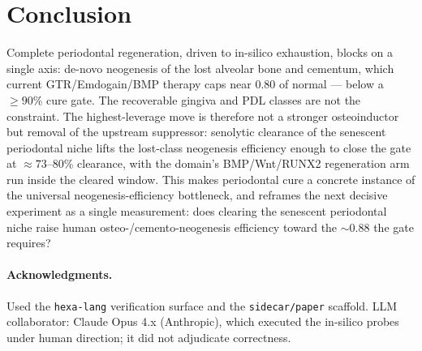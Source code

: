 \documentclass[11pt,a4paper]{article}
\begin{document}
\section{Conclusion}
\label{sec:conclusion}
Complete periodontal regeneration, driven to in-silico exhaustion, blocks on a single
axis: de-novo neogenesis of the lost alveolar bone and cementum, which current
GTR/Emdogain/BMP therapy caps near $0.80$ of normal --- below a $\geq 90\%$ cure gate.
The recoverable gingiva and PDL classes are not the constraint. The highest-leverage
move is therefore not a stronger osteoinductor but removal of the upstream suppressor:
senolytic clearance of the senescent periodontal niche lifts the lost-class neogenesis
efficiency enough to close the gate at $\approx 73$--$80\%$ clearance, with the
domain's BMP/Wnt/RUNX2 regeneration arm run inside the cleared window. This makes
periodontal cure a concrete instance of the universal neogenesis-efficiency
bottleneck, and reframes the next decisive experiment as a single measurement: does
clearing the senescent periodontal niche raise human osteo-/cemento-neogenesis
efficiency toward the $\sim 0.88$ the gate requires?

\paragraph{Acknowledgments.}
Used the \texttt{hexa-lang} verification surface and the \texttt{sidecar/paper}
scaffold. LLM collaborator: Claude Opus 4.x (Anthropic), which executed the in-silico
probes under human direction; it did not adjudicate correctness.

\appendix
\end{document}
